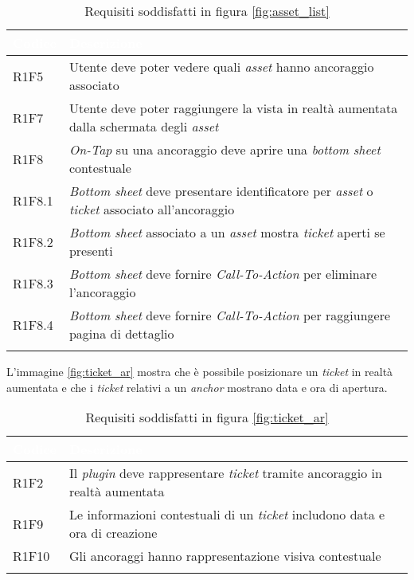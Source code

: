 {
    \setlength{\freewidth}{\dimexpr\textwidth-10\tabcolsep}
    \renewcommand{\arraystretch}{1.5}
    \centering
    \setlength{\aboverulesep}{0pt}
    \setlength{\belowrulesep}{0pt}
    \begin{longtable}{C{.15\freewidth} C{.965\freewidth}}
       \toprule
    \textcolor{white}{\textbf{Codice}}&
    \textcolor{white}{\textbf{Descrizione}}\\
    \toprule
    \endhead

    R1F5 & Utente deve poter vedere quali \textit{asset} hanno ancoraggio associato\\
    R1F7 & Utente deve poter raggiungere la vista in realtà aumentata dalla schermata degli \textit{asset}\\
    R1F8 & \textit{On-Tap} su una ancoraggio deve aprire una \textit{bottom sheet} contestuale\\
    R1F8.1 & \textit{Bottom sheet} deve presentare identificatore per \textit{asset} o \textit{ticket} associato all'ancoraggio\\
    R1F8.2 & \textit{Bottom sheet} associato a un \textit{asset} mostra \textit{ticket} aperti se presenti\\
    R1F8.3 & \textit{Bottom sheet} deve fornire \textit{Call-To-Action} per eliminare l'ancoraggio\\
    R1F8.4 & \textit{Bottom sheet} deve fornire \textit{Call-To-Action} per raggiungere pagina di dettaglio\\
    

    \bottomrule
    \caption{Requisiti soddisfatti in figura \ref{fig:asset_list}}
    \end{longtable}
}

L'immagine \ref{fig:ticket_ar} mostra che è possibile posizionare un \textit{ticket} in realtà aumentata e che i \textit{ticket} relativi a un \textit{anchor} mostrano data e ora di apertura.

{
    \setlength{\freewidth}{\dimexpr\textwidth-10\tabcolsep}
    \renewcommand{\arraystretch}{1.5}
    \centering
    \setlength{\aboverulesep}{0pt}
    \setlength{\belowrulesep}{0pt}
    \begin{longtable}{C{.15\freewidth} C{.965\freewidth}}
       \toprule
    \textcolor{white}{\textbf{Codice}}&
    \textcolor{white}{\textbf{Descrizione}}\\
    \toprule
    \endhead

    R1F2 & Il \textit{plugin} deve rappresentare \textit{ticket} tramite ancoraggio in realtà aumentata\\
    R1F9 & Le informazioni contestuali di un \textit{ticket} includono data e ora di creazione\\
    R1F10 & Gli ancoraggi hanno rappresentazione visiva contestuale\\ 
  
    \bottomrule
    \caption{Requisiti soddisfatti in figura \ref{fig:ticket_ar}}
    \end{longtable}
}

